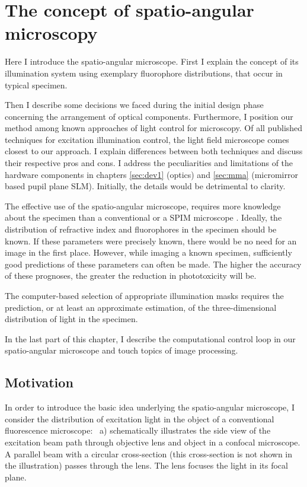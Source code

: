 \chapter{The concept of spatio-angular microscopy}
\label{sec:concept}
\begin{summary}
  Here I introduce the spatio-angular microscope. First I explain the
  concept of its illumination system using exemplary fluorophore
  distributions, that occur in typical specimen.

  Then I describe some decisions we faced during the initial design
  phase concerning the arrangement of optical components. Furthermore,
  I position our method among known approaches of light control for
  microscopy. Of all published techniques for excitation illumination
  control, the light field microscope \citep{Levoy2006} comes closest
  to our approach.  I explain differences between both techniques and
  discuss their respective pros and cons.  I address the peculiarities
  and limitations of the hardware components in chapters
  \ref{sec:dev1} (optics) and \ref{sec:mma} (micromirror based pupil
  plane SLM).  Initially, the details would be detrimental to clarity.

  The effective use of the spatio-angular microscope, requires more
  knowledge about the specimen than a conventional or a SPIM
  microscope \citep{Huisken2004}. Ideally, the distribution of
  refractive index and fluorophores in the specimen should be
  known. If these parameters were precisely known, there would be no
  need for an image in the first place. However, while imaging a known
  specimen, sufficiently good predictions of these parameters can
  often be made. The higher the accuracy of these prognoses, the
  greater the reduction in phototoxicity will be.

  The computer-based selection of appropriate illumination masks
  requires the prediction, or at least an approximate estimation, of
  the three-dimensional distribution of light in the specimen.

  In the last part of this chapter, I describe the computational
  control loop in our spatio-angular
  microscope and touch topics of image processing.
\end{summary}
\section{Motivation}
In order to introduce the basic idea underlying the spatio-angular
microscope, I consider the distribution of excitation light in the
object of a conventional fluorescence microscope:
~a) schematically illustrates the side view
of the excitation beam path through objective lens and object in a
confocal microscope. A parallel beam with a circular cross-section
(this cross-section is not shown in the illustration) passes through
the lens. The lens focuses the light in its focal plane.

